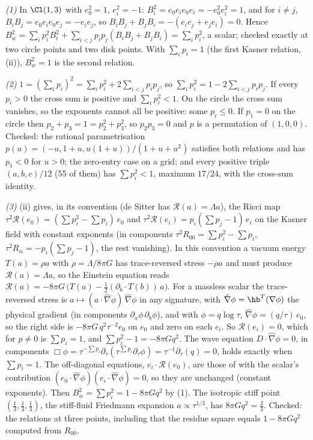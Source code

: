 \emph{(1)} In $\Cl(1,3)$ with $e_0^2 = 1$, $e_i^2 = -1$: $B_i^2 = e_0e_ie_0e_i = -e_0^2e_i^2 = 1$, and for $i \neq j$, $B_iB_j = e_0e_ie_0e_j = -e_ie_j$, so $B_iB_j + B_jB_i = -(e_ie_j + e_je_i) = 0$. Hence $B_w^2 = \sum_i p_i^2 B_i^2 + \sum_{i<j}p_ip_j(B_iB_j + B_jB_i) = \sum_i p_i^2$, a scalar; checked exactly at two circle points and two disk points. With $\sum_i p_i = 1$ (the first Kasner relation, (ii)), $B_w^2 = 1$ is the second relation.

\emph{(2)} $1 = (\sum_i p_i)^2 = \sum_i p_i^2 + 2\sum_{i<j}p_ip_j$, so $\sum_i p_i^2 = 1 - 2\sum_{i<j}p_ip_j$. If every $p_i > 0$ the cross sum is positive and $\sum_i p_i^2 < 1$. On the circle the cross sum vanishes, so the exponents cannot all be positive: some $p_i \leq 0$. If $p_1 = 0$ on the circle then $p_2 + p_3 = 1 = p_2^2 + p_3^2$, so $p_2p_3 = 0$ and $p$ is a permutation of $(1,0,0)$. Checked: the rational parametrisation $p(u) = (-u, 1+u, u(1+u))/(1+u+u^2)$ satisfies both relations and has $p_1 < 0$ for $u > 0$; the zero-entry case on a grid; and every positive triple $(a,b,c)/12$ (55 of them) has $\sum p_i^2 < 1$, maximum $17/24$, with the cross-sum identity.

\emph{(3)} (ii) gives, in its convention (de Sitter has $\mathcal{R}(a) = \Lambda a$), the Ricci map $\tau^2\mathcal{R}(e_0) = (\sum p_i^2 - \sum p_i)\,e_0$ and $\tau^2\mathcal{R}(e_i) = p_i(\sum p_j - 1)\,e_i$ on the Kasner field with constant exponents (in components $\tau^2R_{00} = \sum p_i^2 - \sum p_i$, $\tau^2 R_{ii} = -p_i(\sum p_j - 1)$, the rest vanishing). In this convention a vacuum energy $T(a) = \rho a$ with $\rho = \Lambda/8\pi G$ has trace-reversed stress $-\rho a$ and must produce $\mathcal{R}(a) = \Lambda a$, so the Einstein equation reads $\mathcal{R}(a) = -8\pi G\,\bigl(T(a) - \tfrac12(\partial_b\cdot T(b))\,a\bigr)$. For a massless scalar the trace-reversed stress is $a \mapsto (a\cdot\hat\nabla\phi)\,\hat\nabla\phi$ in any signature, with $\hat\nabla\phi = \hb^{T}(\nabla\phi)$ the physical gradient (in components $\partial_a\phi\,\partial_b\phi$), and with $\phi = q\log\tau$, $\hat\nabla\phi = (q/\tau)\,e_0$, so the right side is $-8\pi G\,q^2\tau^{-2}e_0$ on $e_0$ and zero on each $e_i$. So $\mathcal{R}(e_i) = 0$, which for $p \neq 0$ is $\sum p_i = 1$, and $\sum p_i^2 - 1 = -8\pi G q^2$. The wave equation $D\cdot\hat\nabla\phi = 0$, in components $\Box\phi = \tau^{-\sum p_i}\partial_\tau(\tau^{\sum p_i}\partial_\tau\phi) = \tau^{-1}\partial_\tau(q) = 0$, holds exactly when $\sum p_i = 1$. The off-diagonal equations, $e_i\cdot\mathcal{R}(e_0)$, are those of  with the scalar's contribution $(e_0\cdot\hat\nabla\phi)(e_i\cdot\hat\nabla\phi) = 0$, so they are unchanged (constant exponents). Then $B_w^2 = \sum p_i^2 = 1 - 8\pi G q^2$ by (1). The isotropic stiff point $(\tfrac13,\tfrac13,\tfrac13)$, the stiff-fluid Friedmann expansion $a \propto \tau^{1/3}$, has $8\pi Gq^2 = \tfrac23$. Checked: the relations at three points, including that the residue square equals $1 - 8\pi G q^2$ computed from $R_{00}$.

